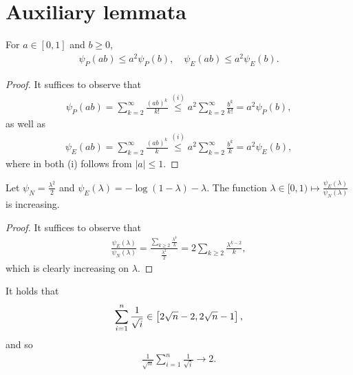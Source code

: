 


\section{Auxiliary lemmata} \label{section:auxiliary_lemmas}

\begin{lemma} \label{lemma:psi_p_decoupled}
For $a \in [0, 1]$ and $b \geq 0$,
\begin{align*}
    \psi_P(ab) \leq a^2 \psi_P(b), \quad \psi_E(ab) \leq a^2 \psi_E(b).
\end{align*}
\end{lemma}

\begin{proof}
    It suffices to observe that
    \begin{align*}
        \psi_P(ab) = \sum_{k = 2}^\infty \frac{(ab)^k}{k!} \stackrel{(i)}{\leq} a^2 \sum_{k = 2}^\infty \frac{b^k}{k!} = a^2 \psi_P(b),
    \end{align*}
    as well as
    \begin{align*}
        \psi_E(ab) = \sum_{k = 2}^\infty \frac{(ab)^k}{k} \stackrel{(i)}{\leq} a^2 \sum_{k = 2}^\infty \frac{b^k}{k} = a^2 \psi_E(b),
    \end{align*}
    where in both (i) follows from $|a| \leq 1$.
\end{proof}

\begin{lemma} \label{lemma:psi_E_vs_psiN_increasing}
Let $\psi_N = \frac{\lambda^2}{2}$ and $\psi_E(\lambda) = -\log(1-\lambda)-\lambda$. The function $\lambda \in [0, 1) \mapsto \frac{\psi_E(\lambda)}{\psi_N(\lambda)}$ is increasing. 
\end{lemma}

\begin{proof}
    It suffices to observe that 
    \begin{align*}
         \frac{\psi_E(\lambda)}{\psi_N(\lambda)} =  \frac{\sum_{k\geq2} \frac{\lambda^k}{k}}{\frac{\lambda^2}{2}} = 2\sum_{k\geq2} \frac{\lambda^{k-2}}{k},
    \end{align*}
    which is clearly increasing on $\lambda$.
\end{proof}


\begin{lemma} \label{lemma:series_one_over_sqrt}
It holds that
\begin{align*} 
    \sum_{i = 1}^n \frac{1}{\sqrt{i}} \in \left[ 2\sqrt{n} - 2, 2\sqrt{n} - 1 \right],
\end{align*}
and so 
\begin{align*}
    \frac{1}{\sqrt{n}}\sum_{i = 1}^n \frac{1}{\sqrt{i}} \to 2.
\end{align*}
\end{lemma}

